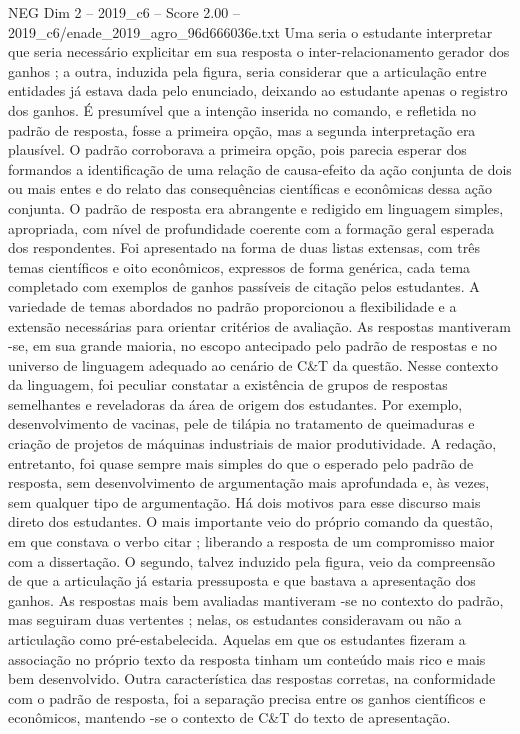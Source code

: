 \begin{textsample}{NEG Dim 2 – 2019\_c6 – Score 2.00 – 2019\_c6/enade\_2019\_agro\_96d666036e.txt}
Uma seria o estudante interpretar que seria necessário explicitar em sua resposta o inter-relacionamento gerador dos ganhos ; a outra, induzida pela figura, seria considerar que a articulação entre entidades já estava dada pelo enunciado, deixando ao estudante apenas o registro dos ganhos.
É presumível que a intenção inserida no comando, e refletida no padrão de resposta, fosse a primeira opção, mas a segunda interpretação era plausível.
O padrão corroborava a primeira opção, pois parecia esperar dos formandos a identificação de uma relação de causa-efeito da ação conjunta de dois ou mais entes e do relato das consequências científicas e econômicas dessa ação conjunta.
O padrão de resposta era abrangente e redigido em linguagem simples, apropriada, com nível de profundidade coerente com a formação geral esperada dos respondentes.
Foi apresentado na forma de duas listas extensas, com três temas científicos e oito econômicos, expressos de forma genérica, cada tema completado com exemplos de ganhos passíveis de citação pelos estudantes.
A variedade de temas abordados no padrão proporcionou a flexibilidade e a extensão necessárias para orientar critérios de avaliação.
As respostas mantiveram -se, em sua grande maioria, no escopo antecipado pelo padrão de respostas e no universo de linguagem adequado ao cenário de C\&T da questão.
Nesse contexto da linguagem, foi peculiar constatar a existência de grupos de respostas semelhantes e reveladoras da área de origem dos estudantes.
Por exemplo, desenvolvimento de vacinas, pele de tilápia no tratamento de queimaduras e criação de projetos de máquinas industriais de maior produtividade.
A redação, entretanto, foi quase sempre mais simples do que o esperado pelo padrão de resposta, sem desenvolvimento de argumentação mais aprofundada e, às vezes, sem qualquer tipo de argumentação.
Há dois motivos para esse discurso mais direto dos estudantes.
O mais importante veio do próprio comando da questão, em que constava o verbo citar ; liberando a resposta de um compromisso maior com a dissertação.
O segundo, talvez induzido pela figura, veio da compreensão de que a articulação já estaria pressuposta e que bastava a apresentação dos ganhos.
As respostas mais bem avaliadas mantiveram -se no contexto do padrão, mas seguiram duas vertentes ; nelas, os estudantes consideravam ou não a articulação como pré-estabelecida.
Aquelas em que os estudantes fizeram a associação no próprio texto da resposta tinham um conteúdo mais rico e mais bem desenvolvido.
Outra característica das respostas corretas, na conformidade com o padrão de resposta, foi a separação precisa entre os ganhos científicos e econômicos, mantendo -se o contexto de C\&T do texto de apresentação.

\end{textsample}

